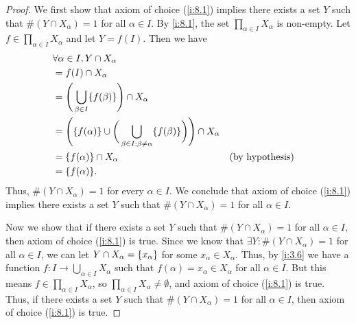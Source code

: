 \begin{proof}
  We first show that axiom of choice (\cref{i:8.1}) implies there exists a set \(Y\) such that \(\#(Y \cap X_{\alpha}) = 1\) for all \(\alpha \in I\).
  By \cref{i:8.1}, the set \(\prod_{\alpha \in I} X_{\alpha}\) is non-empty.
  Let \(f \in \prod_{\alpha \in I} X_{\alpha}\) and let \(Y = f(I)\).
  Then we have
  \begin{align*}
     & \forall \alpha \in I, Y \cap X_{\alpha}                                                                                                             \\
     & = f(I) \cap X_{\alpha}                                                                                                                              \\
     & = \Bigg(\bigcup_{\beta \in I} \set{f(\beta)}\Bigg) \cap X_{\alpha}                                                                                  \\
     & = \Bigg(\set{f(\alpha)} \cup \bigg(\bigcup_{\beta \in I : \beta \neq \alpha} \set{f(\beta)}\bigg)\Bigg) \cap X_{\alpha}                             \\
     & = \set{f(\alpha)} \cap X_{\alpha}                                                                                       &  & \text{(by hypothesis)} \\
     & = \set{f(\alpha)}.
  \end{align*}
  Thus, \(\#(Y \cap X_{\alpha}) = 1\) for every \(\alpha \in I\).
  We conclude that axiom of choice (\cref{i:8.1}) implies there exists a set \(Y\) such that \(\#(Y \cap X_{\alpha}) = 1\) for all \(\alpha \in I\).

  Now we show that if there exists a set \(Y\) such that \(\#(Y \cap X_{\alpha}) = 1\) for all \(\alpha \in I\), then axiom of choice (\cref{i:8.1}) is true.
  Since we know that \(\exists Y : \#(Y \cap X_{\alpha}) = 1\) for all \(\alpha \in I\), we can let \(Y \cap X_{\alpha} = \left\lbrace x_{\alpha}\right\rbrace\) for some \(x_{\alpha} \in X_{\alpha}\).
  Thus, by \cref{i:3.6} we have a function \(f : I \to \bigcup_{\alpha \in I} X_{\alpha}\) such that \(f(\alpha) = x_{\alpha} \in X_{\alpha}\) for all \(\alpha \in I\).
  But this means \(f \in \prod_{\alpha \in I} X_{\alpha}\), so \(\prod_{\alpha \in I} X_{\alpha} \neq \emptyset\), and axiom of choice (\cref{i:8.1}) is true.
  Thus, if there exists a set \(Y\) such that \(\#(Y \cap X_{\alpha}) = 1\) for all \(\alpha \in I\), then axiom of choice (\cref{i:8.1}) is true.
\end{proof}

